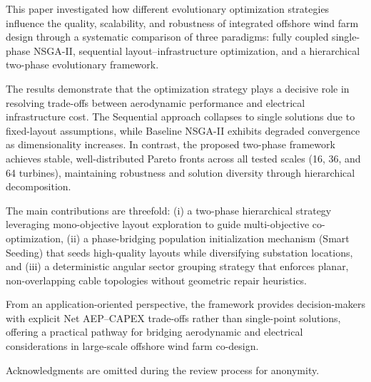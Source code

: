 \documentclass[format=sigconf,anonymous=true,review=true]{acmart}
\begin{document}
This paper investigated how different evolutionary optimization strategies influence the quality, scalability, and robustness of integrated offshore wind farm design through a systematic comparison of three paradigms: fully coupled single-phase NSGA-II, sequential layout--infrastructure optimization, and a hierarchical two-phase evolutionary framework.

The results demonstrate that the optimization strategy plays a decisive role in resolving trade-offs between aerodynamic performance and electrical infrastructure cost. The Sequential approach collapses to single solutions due to fixed-layout assumptions, while Baseline NSGA-II exhibits degraded convergence as dimensionality increases. In contrast, the proposed two-phase framework achieves stable, well-distributed Pareto fronts across all tested scales (16, 36, and 64 turbines), maintaining robustness and solution diversity through hierarchical decomposition.

The main contributions are threefold: (i) a two-phase hierarchical strategy leveraging mono-objective layout exploration to guide multi-objective co-optimization, (ii) a phase-bridging population initialization mechanism (Smart Seeding) that seeds high-quality layouts while diversifying substation locations, and (iii) a deterministic angular sector grouping strategy that enforces planar, non-overlapping cable topologies without geometric repair heuristics.

From an application-oriented perspective, the framework provides decision-makers with explicit Net AEP--CAPEX trade-offs rather than single-point solutions, offering a practical pathway for bridging aerodynamic and electrical considerations in large-scale offshore wind farm co-design.


\begin{acks}
Acknowledgments are omitted during the review process for anonymity.
\end{acks}

\clearpage

\end{document}
